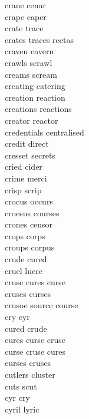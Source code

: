 crane cenar\\
crape caper\\
crate trace\\
crates traces rectas\\
craven cavern\\
crawls scrawl\\
creams scream\\
creating catering\\
creation reaction\\
creations reactions\\
creator reactor\\
credentials centralised\\
credit direct\\
cresset secrets\\
cried cider\\
crime merci\\
crisp scrip\\
crocus occurs\\
croesus courses\\
crones censor\\
crops corps\\
croups corpus\\
crude cured\\
cruel lucre\\
cruse cures curse\\
cruses curses\\
crusoe source course\\
cry cyr\\
cured crude\\
cures curse cruse\\
curse cruse cures\\
curses cruses\\
cutlers cluster\\
cuts scut\\
cyr cry\\
cyril lyric\\

